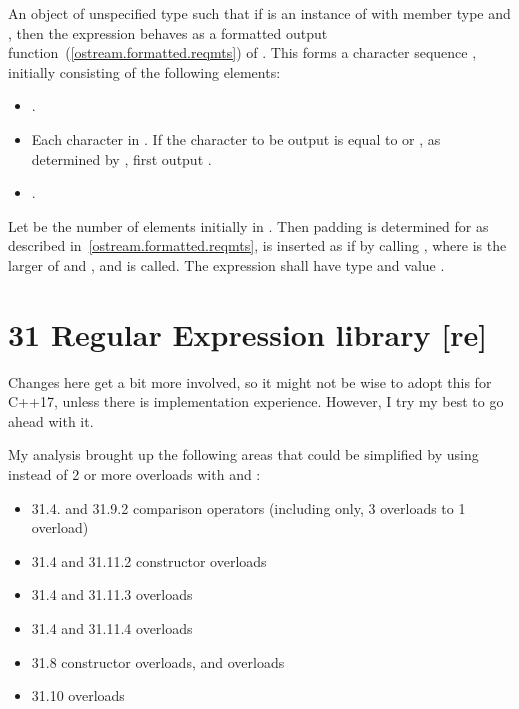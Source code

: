 \documentclass[ebook,11pt,article]{memoir}
\begin{document}
\begin{itemdescr}
\pnum
\returns An object of unspecified type such that if  is an instance
of  with  member type  
 and  , then the expression
behaves as a formatted output function~(\ref{ostream.formatted.reqmts})
of . This forms a character sequence , initially
consisting of the following elements:
\begin{itemize}
\item {}.
\item Each character in . If the character to be output is equal to
 or , as determined by , first
output .
\item {}.
\end{itemize}
Let  be the number of elements initially in .
Then padding is determined for  as described
in~\ref{ostream.formatted.reqmts},  is inserted as if by calling
, where  is the larger of
 and , and  is called.
The expression  shall have type
 and value .
\end{itemdescr}


\section{ 31 Regular Expression library  [re]}%
Changes here get a bit more involved, so it might not be wise to adopt this for C++17, unless there is implementation experience. However, I try my best to go ahead with it. 

My analysis brought up the following areas that could be simplified by using  instead of 2 or more overloads with  and :
\begin{itemize}
\item 31.4. and 31.9.2  comparison operators (including  only, 3 overloads to 1 overload)
\item 31.4 and 31.11.2  constructor overloads
\item 31.4 and 31.11.3  overloads
\item 31.4 and 31.11.4  overloads
\item 31.8  constructor overloads,  and  overloads
\item 31.10  overloads
\end{itemize}
\end{document}
